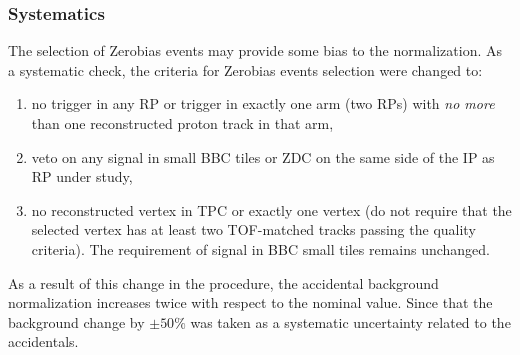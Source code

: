 \subsubsection{Systematics}
The selection of Zerobias events may provide some bias to the normalization. As a systematic check, the criteria for  Zerobias events selection were changed to:
 \begin{enumerate}
 	\item no trigger in any RP or trigger in exactly one arm (two RPs) with \textit{no more} than one reconstructed proton track in that arm,
 	\item veto on any signal in small BBC tiles or ZDC on the same  side of the IP as  RP under study,
 	\item no reconstructed vertex in TPC or exactly one vertex (do not require that the selected vertex has at least two TOF-matched tracks passing the quality criteria). The requirement of signal in BBC small tiles remains unchanged. 
 \end{enumerate}
 As a result of this change in the procedure, the accidental background normalization increases twice with respect to the nominal value. Since that the background change by $\pm50\%$ was taken as a systematic uncertainty related to the accidentals.





